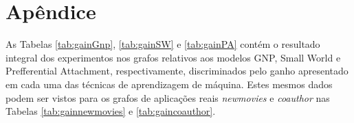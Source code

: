 \documentclass[a4paper,11pt]{article}
\begin{document}

\newpage
\section*{Apêndice}

As Tabelas \ref{tab:gainGnp}, \ref{tab:gainSW} e \ref{tab:gainPA} contém o resultado integral dos experimentos nos grafos relativos aos modelos GNP, Small World e Prefferential Attachment, respectivamente, discriminados pelo ganho apresentado em cada uma das técnicas de aprendizagem de máquina. Estes mesmos dados podem ser vistos para os grafos de aplicações reais \textit{newmovies} e \textit{coauthor} nas Tabelas \ref{tab:gainnewmovies} e \ref{tab:gaincoauthor}.
\end{document}
